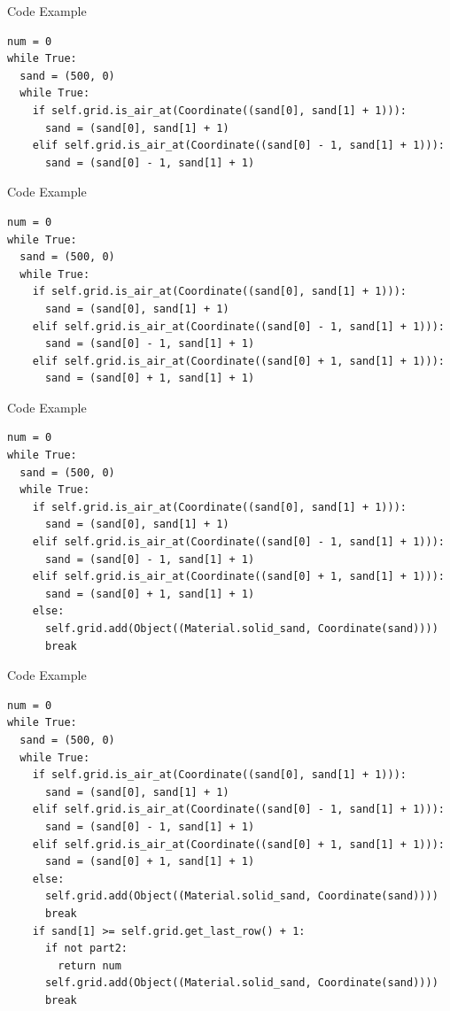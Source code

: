 \documentclass{beamer}
\begin{document}
\setcounter{framenumber}{8}
\begin{frame}[fragile,t]{Code Example}
    \begin{verbatim}
num = 0
while True:
  sand = (500, 0)
  while True:
    if self.grid.is_air_at(Coordinate((sand[0], sand[1] + 1))):
      sand = (sand[0], sand[1] + 1)
    elif self.grid.is_air_at(Coordinate((sand[0] - 1, sand[1] + 1))):
      sand = (sand[0] - 1, sand[1] + 1)
    \end{verbatim}
\end{frame}

\setcounter{framenumber}{8}
\begin{frame}[fragile,t]{Code Example}
    \begin{verbatim}
num = 0
while True:
  sand = (500, 0)
  while True:
    if self.grid.is_air_at(Coordinate((sand[0], sand[1] + 1))):
      sand = (sand[0], sand[1] + 1)
    elif self.grid.is_air_at(Coordinate((sand[0] - 1, sand[1] + 1))):
      sand = (sand[0] - 1, sand[1] + 1)
    elif self.grid.is_air_at(Coordinate((sand[0] + 1, sand[1] + 1))):
      sand = (sand[0] + 1, sand[1] + 1)
    \end{verbatim}
\end{frame}

\setcounter{framenumber}{8}
\begin{frame}[fragile,t]{Code Example}
    \begin{verbatim}
num = 0
while True:
  sand = (500, 0)
  while True:
    if self.grid.is_air_at(Coordinate((sand[0], sand[1] + 1))):
      sand = (sand[0], sand[1] + 1)
    elif self.grid.is_air_at(Coordinate((sand[0] - 1, sand[1] + 1))):
      sand = (sand[0] - 1, sand[1] + 1)
    elif self.grid.is_air_at(Coordinate((sand[0] + 1, sand[1] + 1))):
      sand = (sand[0] + 1, sand[1] + 1)
    else:
      self.grid.add(Object((Material.solid_sand, Coordinate(sand))))
      break
    \end{verbatim}
\end{frame}

\setcounter{framenumber}{8}
\begin{frame}[fragile,t]{Code Example}
    \begin{verbatim}
num = 0
while True:
  sand = (500, 0)
  while True:
    if self.grid.is_air_at(Coordinate((sand[0], sand[1] + 1))):
      sand = (sand[0], sand[1] + 1)
    elif self.grid.is_air_at(Coordinate((sand[0] - 1, sand[1] + 1))):
      sand = (sand[0] - 1, sand[1] + 1)
    elif self.grid.is_air_at(Coordinate((sand[0] + 1, sand[1] + 1))):
      sand = (sand[0] + 1, sand[1] + 1)
    else:
      self.grid.add(Object((Material.solid_sand, Coordinate(sand))))
      break
    if sand[1] >= self.grid.get_last_row() + 1:
      if not part2:
        return num
      self.grid.add(Object((Material.solid_sand, Coordinate(sand))))
      break
    \end{verbatim}
\end{frame}
\end{document}
